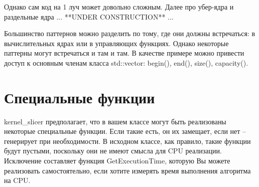 \documentclass[11pt,fleqn,english,russian]{report} %
\begin{document}
Однако сам код на 1 луч может довольно сложным. Далее про убер-ядра и раздельные ядра ... **UNDER CONSTRUCTION** ...  

\begin{remark}
Большинство паттернов можно разделить по тому, где они должны встречаться: в вычислительных ядрах или в управляющих функциях. Однако некоторые паттерны могут встречаться и там и там. В качестве примере можно привести доступ к основным членам класса std::vector: begin(), end(), size(), capacity().
\end{remark}

\chapter{Специальные функции}\label{spec_functions}

kernel\_slicer предполагает, что в вашем классе могут быть реализованы некоторые специальные функции. Если такие есть, он их замещает, если нет -- генерирует при необходимости. В исходном классе, как правило, такие функции будут пустыми, поскольку они не имеют смысла для CPU реализации. Исключение составляет функция GetExecutionTime, которую Вы можете реализовать самостоятельно, если хотите измерять время выполнения алгоритма на CPU.
\end{document}

